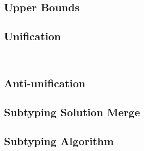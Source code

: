 \documentclass[a4,natbib=false]{article}
\begin{document}
\subsection{Upper Bounds}



\subsection{Unification}
\

\subsection{Anti-unification}


\subsection{Subtyping Solution Merge}


\subsection{Subtyping Algorithm}

\end{document}
